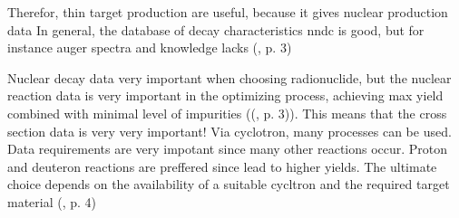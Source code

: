 Therefor, thin target production are useful, because it gives nuclear production data 
In general, the database of decay characteristics nndc is good, but for instance auger spectra and knowledge lacks (\cite{international2012iaea}, p. 3)

Nuclear decay data very important when choosing radionuclide, but the nuclear reaction data is very important in the optimizing process, achieving max yield combined with minimal level of impurities ((\cite{international2012iaea}, p. 3)). This means that the cross section data is very very important! Via cyclotron, many processes can be used. Data requirements are very impotant since many other reactions occur. Proton and deuteron reactions are preffered since lead to higher yields. The ultimate choice depends on the availability of a suitable cycltron and the required target material (\cite{international2012iaea}, p. 4)






